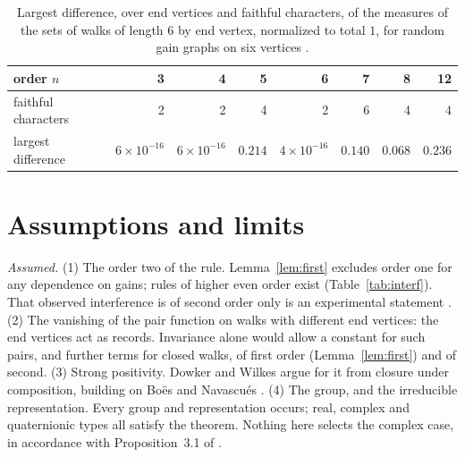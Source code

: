 \begin{table}[ht]\centering\small
\begin{tabular}{@{}lrrrrrrr@{}}\toprule
order $n$ & 3 & 4 & 5 & 6 & 7 & 8 & 12\\\midrule
faithful characters & 2 & 2 & 4 & 2 & 6 & 4 & 4\\
largest difference & $6\times10^{-16}$ & $6\times10^{-16}$ & $0.214$ & $4\times10^{-16}$ & $0.140$ & $0.068$ & $0.236$\\\bottomrule
\end{tabular}
\caption{Largest difference, over end vertices and faithful characters, of the measures of the sets of walks of length $6$ by end vertex, normalized to total $1$, for random gain graphs on six vertices \cite{comp2}.}\label{tab:char}
\end{table}

\section{Assumptions and limits}\label{sec:limits}

\emph{Assumed.} (1) The order two of the rule. Lemma~\ref{lem:first} excludes order one for any dependence on gains; rules of higher even order exist (Table~\ref{tab:interf}). That observed interference is of second order only is an experimental statement \cite{sinha}. (2) The vanishing of the pair function on walks with different end vertices: the end vertices act as records. Invariance alone would allow a constant for such pairs, and further terms for closed walks, of first order (Lemma~\ref{lem:first}) and of second. (3) Strong positivity. Dowker and Wilkes argue for it from closure under composition, building on Bo\"es and Navascu\'es \cite{dw,bn}. (4) The group, and the irreducible representation. Every group and representation occurs; real, complex and quaternionic types all satisfy the theorem. Nothing here selects the complex case, in accordance with Proposition~3.1 of \cite{g7}.

